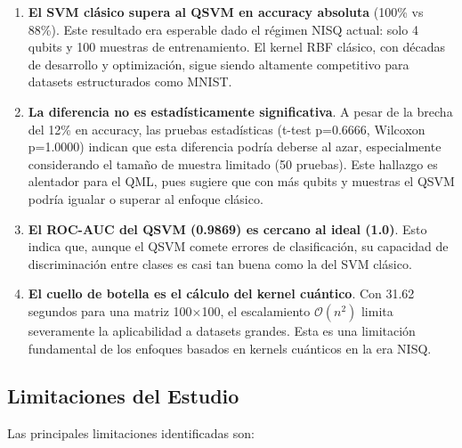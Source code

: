 \documentclass[conference]{IEEEtran}
\begin{document}
\begin{enumerate}
    \item \textbf{El SVM clásico supera al QSVM en accuracy absoluta} (100\% 
          vs 88\%). Este resultado era esperable dado el régimen NISQ actual: 
          solo 4 qubits y 100 muestras de entrenamiento. El kernel RBF clásico, 
          con décadas de desarrollo y optimización, sigue siendo altamente 
          competitivo para datasets estructurados como MNIST.
    
    \item \textbf{La diferencia no es estadísticamente significativa}. A pesar 
          de la brecha del 12\% en accuracy, las pruebas estadísticas (t-test 
          p=0.6666, Wilcoxon p=1.0000) indican que esta diferencia podría 
          deberse al azar, especialmente considerando el tamaño de muestra 
          limitado (50 pruebas). Este hallazgo es alentador para el QML, pues 
          sugiere que con más qubits y muestras el QSVM podría igualar o superar 
          al enfoque clásico.
    
    \item \textbf{El ROC-AUC del QSVM (0.9869) es cercano al ideal (1.0)}. 
          Esto indica que, aunque el QSVM comete errores de clasificación, su 
          capacidad de discriminación entre clases es casi tan buena como la 
          del SVM clásico.
    
    \item \textbf{El cuello de botella es el cálculo del kernel cuántico}. Con 
          31.62 segundos para una matriz 100$\times$100, el escalamiento 
          $\mathcal{O}(n^2)$ limita severamente la aplicabilidad a datasets 
          grandes. Esta es una limitación fundamental de los enfoques basados 
          en kernels cuánticos en la era NISQ.
\end{enumerate}

\subsection{Limitaciones del Estudio}

Las principales limitaciones identificadas son:
\end{document}
